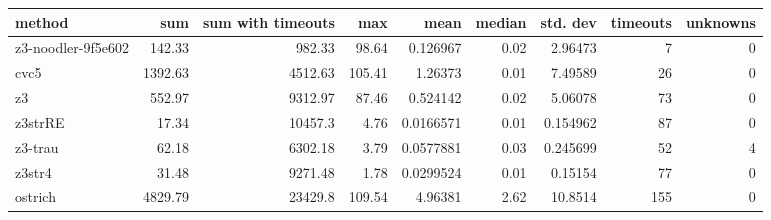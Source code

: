 \begin{tabular}{lrrrrrrrr}
\hline
 method             &     sum &   sum with timeouts &    max &      mean &   median &   std. dev &   timeouts &   unknowns \\
\hline
 z3-noodler-9f5e602 &  142.33 &              982.33 &  98.64 & 0.126967  &     0.02 &   2.96473  &          7 &          0 \\
 cvc5               & 1392.63 &             4512.63 & 105.41 & 1.26373   &     0.01 &   7.49589  &         26 &          0 \\
 z3                 &  552.97 &             9312.97 &  87.46 & 0.524142  &     0.02 &   5.06078  &         73 &          0 \\
 z3strRE            &   17.34 &            10457.3  &   4.76 & 0.0166571 &     0.01 &   0.154962 &         87 &          0 \\
 z3-trau            &   62.18 &             6302.18 &   3.79 & 0.0577881 &     0.03 &   0.245699 &         52 &          4 \\
 z3str4             &   31.48 &             9271.48 &   1.78 & 0.0299524 &     0.01 &   0.15154  &         77 &          0 \\
 ostrich            & 4829.79 &            23429.8  & 109.54 & 4.96381   &     2.62 &  10.8514   &        155 &          0 \\
\hline
\end{tabular}
